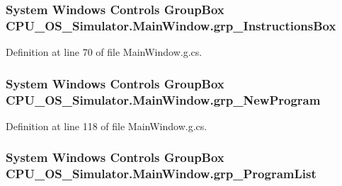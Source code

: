 \subsubsection[{grp\+\_\+\+Instructions\+Box}]{\setlength{\rightskip}{0pt plus 5cm}System Windows Controls Group\+Box C\+P\+U\+\_\+\+O\+S\+\_\+\+Simulator.\+Main\+Window.\+grp\+\_\+\+Instructions\+Box\hspace{0.3cm}{\ttfamily [package]}}\label{class_c_p_u___o_s___simulator_1_1_main_window_aebc1256b654d001b7c4ce2bc08522667}


Definition at line 70 of file Main\+Window.\+g.\+cs.

\hypertarget{class_c_p_u___o_s___simulator_1_1_main_window_a1e75e7af485b229372a6aafb84c2ffe0}{}
\subsubsection[{grp\+\_\+\+New\+Program}]{\setlength{\rightskip}{0pt plus 5cm}System Windows Controls Group\+Box C\+P\+U\+\_\+\+O\+S\+\_\+\+Simulator.\+Main\+Window.\+grp\+\_\+\+New\+Program\hspace{0.3cm}{\ttfamily [package]}}\label{class_c_p_u___o_s___simulator_1_1_main_window_a1e75e7af485b229372a6aafb84c2ffe0}


Definition at line 118 of file Main\+Window.\+g.\+cs.

\hypertarget{class_c_p_u___o_s___simulator_1_1_main_window_a0ccd227c10c9a0878095ef10c0ff92b7}{}
\subsubsection[{grp\+\_\+\+Program\+List}]{\setlength{\rightskip}{0pt plus 5cm}System Windows Controls Group\+Box C\+P\+U\+\_\+\+O\+S\+\_\+\+Simulator.\+Main\+Window.\+grp\+\_\+\+Program\+List\hspace{0.3cm}{\ttfamily [package]}}\label{class_c_p_u___o_s___simulator_1_1_main_window_a0ccd227c10c9a0878095ef10c0ff92b7}



